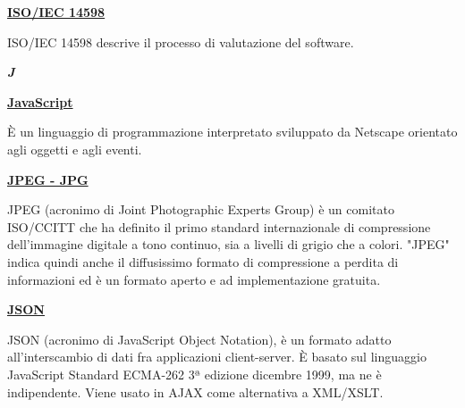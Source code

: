 \bigskip
\begin{addmargin}[0em]{0em}
	\textbf{\underline{ISO/IEC 14598}}
\end{addmargin}
	
\medskip
\begin{addmargin}[5em]{1em}	
ISO/IEC 14598 descrive il processo di valutazione del software.  
\end{addmargin}	

\newpage

\cleardoublepage
{}
{}
\noindent\hrulefill\hspace{4mm}\textbf{\textsl{\Huge{J}}}\hspace{4mm}\hrulefill

\vspace*{2\bigskipamount}

\begin{addmargin}[0em]{0em}	
	\textbf{\underline{JavaScript}}
\end{addmargin}

\medskip
\begin{addmargin}[5em]{1em}
È un linguaggio di programmazione interpretato sviluppato da Netscape orientato agli oggetti e agli eventi.
\end{addmargin}
	
\bigskip
\begin{addmargin}[0em]{0em}	
	\textbf{\underline{JPEG - JPG}}
\end{addmargin}

\medskip
\begin{addmargin}[5em]{1em}
JPEG (acronimo di Joint Photographic Experts Group) è un comitato ISO/CCITT che ha definito il primo standard internazionale di compressione dell'immagine digitale a tono continuo, sia a livelli di grigio che a colori.
"JPEG" indica quindi anche il diffusissimo formato di compressione a perdita di informazioni ed è un formato aperto e ad implementazione gratuita.
\end{addmargin}	

\bigskip
\begin{addmargin}[0em]{0em}	
	\textbf{\underline{JSON}}
\end{addmargin}

\medskip
\begin{addmargin}[5em]{1em}
JSON (acronimo di JavaScript Object Notation), è un formato adatto all'interscambio di dati fra applicazioni client-server. È basato sul linguaggio JavaScript Standard ECMA-262 3ª edizione dicembre 1999, ma ne è indipendente. Viene usato in AJAX come alternativa a XML/XSLT.
\end{addmargin}

